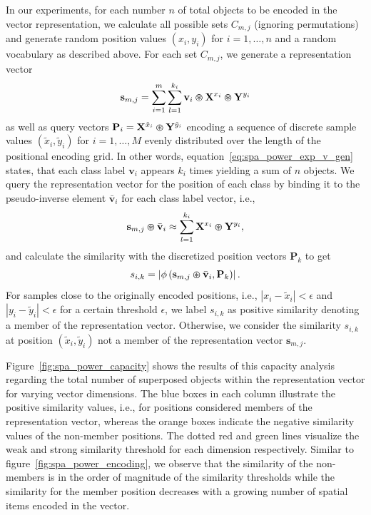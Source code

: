 In our experiments, for each number $n$ of total objects to be encoded in the vector representation, we calculate all possible sets $C_{m,j}$ (ignoring permutations) and generate random position values $ \left(x_{i}, y_{i}\right)$ for $i=1, \ldots, n$ and a random vocabulary as described above.
For each set $C_{m,j}$, we generate a representation vector 
\begin{equation}
\label{eq:spa_power_exp_v_gen}
\mathbf{s}_{m,j} = \sum\limits_{i=1}^{m} \sum\limits_{l=1}^{k_{i}} \mathbf{v}_{i} \varoast \mathbf{X}^{x_{i}} \varoast \mathbf{Y}^{y_{i}}
\end{equation}
as well as query vectors $ {\mathbf{P}}_{i} = \mathbf{X}^{\tilde{x}_{i}} \varoast \mathbf{Y}^{\tilde{y}_i} $ encoding a sequence of discrete sample values $ \left( \tilde{x}_{i}, \tilde{y}_{i} \right)$ for $i=1, \ldots, M$ evenly distributed over the length of the positional encoding grid.
In other words, equation~\eqref{eq:spa_power_exp_v_gen} states, that each class label $ \mathbf{v}_{i}$ appears $k_{i}$ times yielding a sum of $n$ objects.
We query the representation vector for the position of each class by binding it to the pseudo-inverse element $ \bar{ \mathbf{v}}_{i}$ for each class label vector, i.e., 
\begin{equation}
\label{eq:spa_power_query}
\mathbf{s}_{m,j} \varoast \bar{ \mathbf{v}}_{i} \approx \sum\limits_{l=1}^{k_{i}} \mathbf{X}^{{x}_{i}} \varoast \mathbf{Y}^{{y}_i}, 
\end{equation}
and calculate the similarity with the discretized position vectors $ \mathbf{P}_{k}$ to get
\begin{equation}
\label{eq:text}
s_{i,k} = \left|\phi \left( \mathbf{s}_{m,j} \varoast \bar{ \mathbf{v}}_{i}, \mathbf{P}_{k}\right) \right|.
\end{equation}
For samples close to the originally encoded positions, i.e., $\left| x_{i} - \tilde{x}_{i}\right| < \epsilon$ and $\left| y_{i} - \tilde{y}_{i}\right| < \epsilon$ for a certain threshold $\epsilon$, we label $s_{i,k}$ as positive similarity denoting a member of the representation vector.
Otherwise, we consider the similarity $s_{i,k}$ at position $\left( \tilde{x}_{i}, \tilde{y}_{i} \right)$ not a member of the representation vector $ \mathbf{s}_{m,j}$.

Figure~\ref{fig:spa_power_capacity} shows the results of this capacity analysis regarding the total number of superposed objects within the representation vector for varying vector dimensions.
The blue boxes in each column illustrate the positive similarity values, i.e., for positions considered members of the representation vector, whereas the orange boxes indicate the negative similarity values of the non-member positions.
The dotted red and green lines visualize the weak and strong similarity threshold for each dimension respectively.
Similar to figure~\ref{fig:spa_power_encoding}, we observe that the similarity of the non-members is in the order of magnitude of the similarity thresholds while the similarity for the member position decreases with a growing number of spatial items encoded in the vector.

